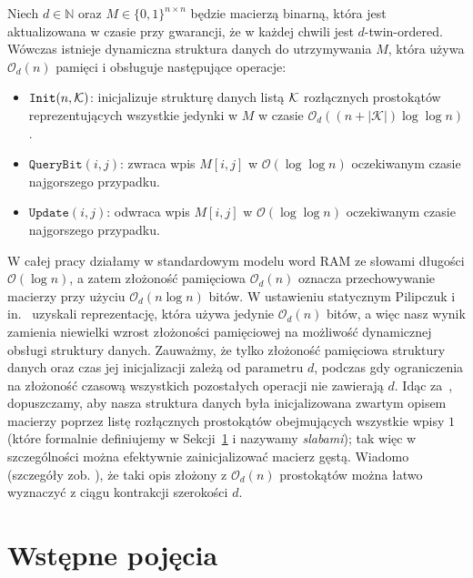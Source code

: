 \documentclass[runningheads]{llncs}
\newcommand{\Oh}{\mathcal{O}}
\begin{document}
\begin{theorem}\label{thm:main}
	Niech $d\in \mathbb{N}$ oraz $M \in \{0,1\}^{n \times n}$ będzie macierzą binarną,
	która jest aktualizowana w czasie przy gwarancji, że w każdej chwili jest
	$d$-twin-ordered. Wówczas istnieje dynamiczna struktura
	danych do utrzymywania $M$, która używa $\Oh_d(n)$ pamięci i obsługuje
	następujące operacje:
	\begin{itemize}
		\item $\mathtt{Init}(n, \cal K)$: inicjalizuje strukturę danych
		listą $\cal K$ rozłącznych prostokątów reprezentujących wszystkie jedynki
		w $M$ w czasie $\Oh_d((n + |{\mathcal{K}}|) \log \log n)$.
		\item $\mathtt{QueryBit}(i,j)$: zwraca
		wpis $M[i, j]$ w $\Oh(\log \log n)$ oczekiwanym czasie najgorszego
		przypadku.
\item $\mathtt{Update}(i, j)$: odwraca wpis $M[i, j]$
		w $\Oh(\log \log n)$ oczekiwanym czasie najgorszego przypadku.
	\end{itemize}
\end{theorem}

W całej pracy działamy w standardowym modelu word RAM ze słowami
długości $\Oh(\log n)$, a zatem złożoność pamięciowa $\Oh_d(n)$ oznacza przechowywanie
macierzy przy użyciu \linebreak$\Oh_d(n \log n)$ bitów. 
W ustawieniu statycznym
Pilipczuk i in.~\cite{tww-repr} uzyskali reprezentację, która
używa jedynie $\Oh_d(n)$ bitów, a więc nasz wynik zamienia niewielki wzrost złożoności pamięciowej na możliwość dynamicznej obsługi struktury danych.
Zauważmy, że tylko złożoność pamięciowa struktury danych oraz
czas jej inicjalizacji zależą od parametru $d$, podczas gdy
ograniczenia na złożoność czasową wszystkich pozostałych operacji nie
zawierają $d$.
Idąc za~\cite{tww-repr}, dopuszczamy, aby nasza struktura danych była
inicjalizowana zwartym opisem macierzy poprzez listę
rozłącznych prostokątów obejmujących wszystkie wpisy $1$ (które formalnie definiujemy w Sekcji~\ref{sec:preliminaries} i nazywamy {\em{slabami}}); tak więc
w szczególności można efektywnie zainicjalizować macierz gęstą. 
Wiadomo (szczegóły zob. \cite[Lemma~10]{tww-repr}), że taki
opis złożony z $\Oh_d(n)$ prostokątów można łatwo wyznaczyć
z ciągu kontrakcji szerokości $d$.










 

\section{Wstępne pojęcia}
\label{sec:preliminaries}
\end{document}
